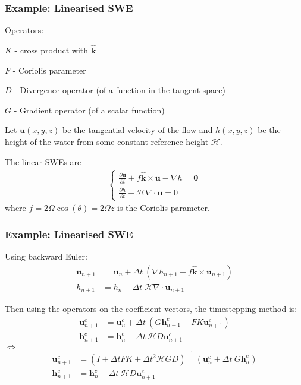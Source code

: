 \documentclass[10pt]{beamer}
\newcommand{\unitvec}{\hat{\bm{k}}}
\begin{document}
\frame
{
    \frametitle{Example: Linearised SWE}

Operators:

$K$ - cross product with $\unitvec$

$F$ - Coriolis parameter

$D$ - Divergence operator (of a function in the tangent space)

$G$ - Gradient operator (of a scalar function)

Let $\mathbf{u}(x,y,z)$ be the tangential velocity of the flow and $h(x,y,z)$ be the height of the water from some constant reference height $\mathcal{H}$.

The linear SWEs are
\begin{align}
\begin{cases}
\frac{\partial \mathbf{u}}{\partial t} + f \unitvec \times \mathbf{u} - \nabla h = \mathbf{0} \\
\frac{\partial h}{\partial t} + \mathcal{H} \nabla \cdot \mathbf{u} = 0
\end{cases}
\end{align}
where $f = 2 \Omega \cos(\theta) =  2 \Omega z$ is the Coriolis parameter.
   
}

\frame
{
    \frametitle{Example: Linearised SWE}

Using backward Euler:
\begin{align}
\mathbf{u}_{n+1} &= \mathbf{u}_{n} + \Delta t \: (\nabla h_{n+1} - f \unitvec \times \mathbf{u}_{n+1}) \\
h_{n+1} &= h_n - \Delta t \: \mathcal{H} \nabla \cdot \mathbf{u}_{n+1}
\end{align}

Then using the operators on the coefficient vectors, the timestepping method is: 
\begin{align}
\mathbf{u}^c_{n+1} &= \mathbf{u}^c_{n} + \Delta t \: (G \mathbf{h}^c_{n+1} - F K \mathbf{u}^c_{n+1}) \\
\mathbf{h}^c_{n+1} &= \mathbf{h}^c_n - \Delta t \: \mathcal{H} D \mathbf{u}^c_{n+1}
\end{align}
$\iff$
\begin{align}
\mathbf{u}^c_{n+1} &= (I + \Delta t F K + \Delta t^2 \mathcal{H} G D)^{-1} \: (\mathbf{u}^c_{n} + \Delta t \: G \mathbf{h}^c_n) \\
\mathbf{h}^c_{n+1} &= \mathbf{h}^c_n - \Delta t \: \mathcal{H} D \mathbf{u}^c_{n+1}
\end{align}
   
}
\end{document}
